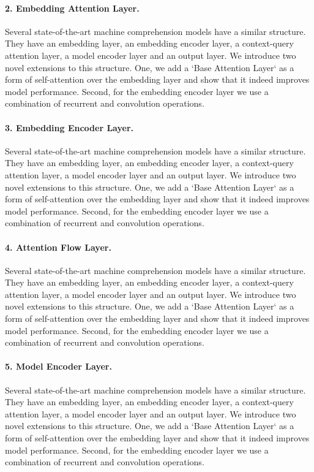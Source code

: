 \paragraph{2. Embedding Attention Layer.} Several state-of-the-art machine comprehension models have a similar structure. They have an embedding layer, an embedding encoder layer, a context-query attention layer, a model encoder layer and an output layer. We introduce two novel extensions to this structure.  One, we add a `Base Attention Layer` as a form of self-attention over the embedding layer and show that it indeed improves model performance. Second, for the embedding encoder layer we use a combination of recurrent and convolution operations. 

\paragraph{3. Embedding Encoder Layer.} Several state-of-the-art machine comprehension models have a similar structure. They have an embedding layer, an embedding encoder layer, a context-query attention layer, a model encoder layer and an output layer. We introduce two novel extensions to this structure.  One, we add a `Base Attention Layer` as a form of self-attention over the embedding layer and show that it indeed improves model performance. Second, for the embedding encoder layer we use a combination of recurrent and convolution operations. 

\paragraph{4. Attention Flow Layer.} Several state-of-the-art machine comprehension models have a similar structure. They have an embedding layer, an embedding encoder layer, a context-query attention layer, a model encoder layer and an output layer. We introduce two novel extensions to this structure.  One, we add a `Base Attention Layer` as a form of self-attention over the embedding layer and show that it indeed improves model performance. Second, for the embedding encoder layer we use a combination of recurrent and convolution operations. 

\paragraph{5. Model Encoder Layer.} Several state-of-the-art machine comprehension models have a similar structure. They have an embedding layer, an embedding encoder layer, a context-query attention layer, a model encoder layer and an output layer. We introduce two novel extensions to this structure.  One, we add a `Base Attention Layer` as a form of self-attention over the embedding layer and show that it indeed improves model performance. Second, for the embedding encoder layer we use a combination of recurrent and convolution operations. 

